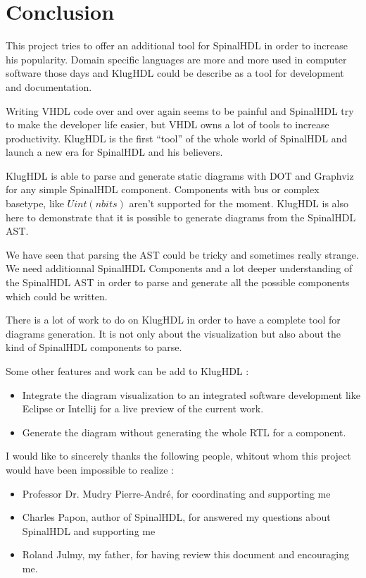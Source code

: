 \chapter{Conclusion}
\label{cha:Conclusion}

This project tries to offer an additional tool for SpinalHDL in order to
increase his popularity. Domain specific languages are more and more used in
computer software those days and KlugHDL could be describe as a tool for
development and documentation.

Writing VHDL code over and over again seems to be painful and SpinalHDL try to
make the developer life easier, but VHDL owns a lot of tools to increase
productivity. KlugHDL is the first ``tool'' of the whole world of SpinalHDL and
launch a new era for SpinalHDL and his believers.

KlugHDL is able to parse and generate static diagrams with DOT and Graphviz for
any simple SpinalHDL component. Components with bus or complex basetype, like
$Uint(n bits)$ aren't supported for the moment. KlugHDL is also here to
demonstrate that it is possible to generate diagrams from the SpinalHDL AST.

We have seen that parsing the AST could be tricky and sometimes really strange.
We need additionnal SpinalHDL Components and a lot deeper understanding of the
SpinalHDL AST in order to parse and generate all the possible components which
could be written.

There is a lot of work to do on KlugHDL in order to have a complete tool for
diagrams generation. It is not only about the visualization but also about the
kind of SpinalHDL components to parse.

Some other features and work can be add to KlugHDL :
\begin{itemize}
\item Integrate the diagram visualization to an integrated software development
  like Eclipse or Intellij for a live preview of the current work.
\item Generate the diagram without generating the whole RTL for a component.
\end{itemize}

I would like to sincerely thanks the following people, whitout whom this project
would have been impossible to realize :

\begin{itemize}
\item Professor Dr. Mudry Pierre-André, for coordinating and supporting me
\item Charles Papon, author of SpinalHDL, for answered my questions about
  SpinalHDL and supporting me
\item Roland Julmy, my father, for having review this document and encouraging me.
\end{itemize}

